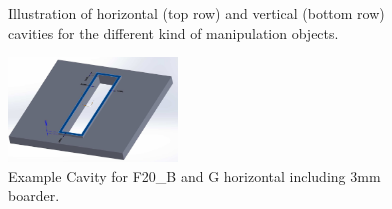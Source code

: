 \begin{figure} [h!]
\begin{center}
		 \hspace{0.1cm}
		  \hspace{0.1cm}
		  \hspace{0.1cm}
	\end{center}
	\caption{Illustration of horizontal (top row) and vertical (bottom row) cavities for the different kind of manipulation objects.}
	\label{fig:ppt_tiles}
\end{figure}



\begin{figure} [h!]
	\centering
	\includegraphics[width= 0.4\textwidth ]{./images/ExampleCavity.jpg}
	\caption{Example Cavity for F20\_B and G horizontal including $3\si{\milli\meter}$ boarder. }
	\label{fig:exampleCavity}
\end{figure}

